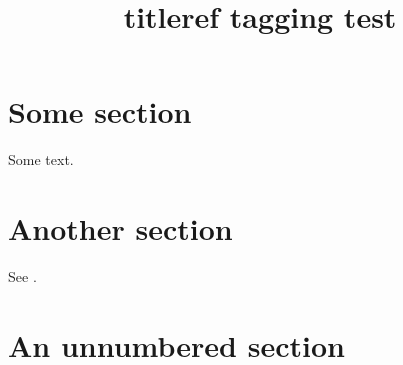 \documentclass{article}
\title{titleref tagging test}
\begin{document}
\tableofcontents

\section[short]{Some section}
\label{sec}

Some text.

\section{Another section}

See .

\section*{An unnumbered section}
\label{unnum}

\end{document}

